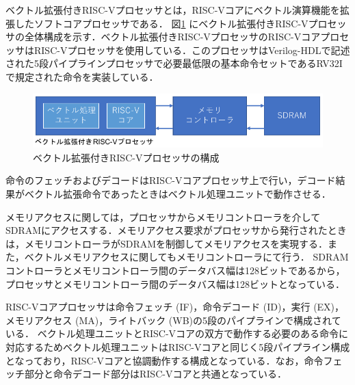 ベクトル拡張付きRISC-Vプロセッサとは，RISC-Vコアにベクトル演算機能を拡張したソフトコアプロセッサである．
図\ref{fig:MIQS_system}
にベクトル拡張付きRISC-Vプロセッサの全体構成を示す．ベクトル拡張付きRISC-VプロセッサのRISC-VコアプロセッサはRISC-Vプロセッサを使用している．このプロセッサはVerilog-HDLで記述された5段パイプラインプロセッサで必要最低限の基本命令セットであるRV32Iで規定された命令を実装している．

\begin{figure}[b]
\begin{center}
    \includegraphics[scale=1.2]{image/MIQS_system.pdf}
    \caption{ベクトル拡張付きRISC-Vプロセッサの構成}
    \label{fig:MIQS_system}
\end{center}
\end{figure}

命令のフェッチおよびデコードはRISC-Vコアプロセッサ上で行い，デコード結果がベクトル拡張命令であったときはベクトル処理ユニットで動作させる．

メモリアクセスに関しては，プロセッサからメモリコントローラを介してSDRAMにアクセスする．メモリアクセス要求がプロセッサから発行されたときは，メモリコントローラがSDRAMを制御してメモリアクセスを実現する．また，ベクトルメモリアクセスに関してもメモリコントローラにて行う．
SDRAMコントローラとメモリコントローラ間のデータバス幅は128ビットであるから，プロセッサとメモリコントローラ間のデータバス幅は128ビットとなっている．

RISC-Vコアプロセッサは命令フェッチ (IF)，命令デコード (ID)，実行 (EX)，メモリアクセス (MA)，ライトバック (WB)の5段のパイプラインで構成されている．
ベクトル処理ユニットとRISC-Vコアの双方で動作する必要のある命令に対応するためベクトル処理ユニットはRISC-Vコアと同じく5段パイプライン構成となっており，RISC-Vコアと協調動作する構成となっている．なお，命令フェッチ部分と命令デコード部分はRISC-Vコアと共通となっている．

